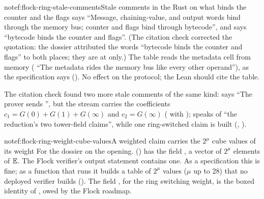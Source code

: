 \begin{finding}{note}{f:flock-ring-stale-comments}{Stale comments in the Rust on what binds the
counter and the flags}
  says \enquote{Message, chaining-value, and output words
bind through the memory bus; counter and flags bind through bytecode}, and 
says \enquote{bytecode binds the counter and flags}. (The citation check corrected the quotation:
the dossier attributed the words \enquote{bytecode binds the counter and flags} to both places;
they are at  only.) The table reads the metadata cell from memory
( \enquote{The metadata rides the memory bus like every other operand}),
as the specification says (). No effect on the protocol; the Lean should cite the
table.

The citation check found two more stale comments of the same kind: 
says \enquote{The prover sends }, but the stream carries the coefficients $c_1
= G(0) + G(1) + G(∞)$ and $c_2 = G(∞)$ ( with );
 speaks of \enquote{the reduction's two tower-field claims}, while one
ring-switched claim is built (, ).
\end{finding}

\begin{finding}{note}{f:flock-ring-weight-cube-values}{A weighted claim carries the $2^μ$ cube
values of its weight}
 For the dossier on the opening.  ()
has the field , a vector of $2^μ$ elements of $\mathbb{E}$. The Flock
verifier's output statement contains one. As a specification this is fine; as a function that
runs it builds a table of $2^μ$ values ($μ$ up to 28) that no deployed verifier builds
(). The field , for the ring switching weight, is the boxed
identity of , owed by the Flock roadmap.
\end{finding}
